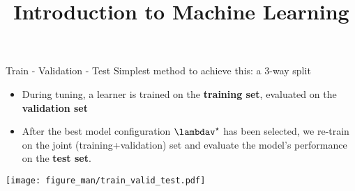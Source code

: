 \documentclass[11pt,compress,t,notes=noshow, xcolor=table]{beamer}
\title{Introduction to Machine Learning}
\institute{\href{https://compstat-lmu.github.io/lecture_i2ml/}{compstat-lmu.github.io/lecture\_i2ml}}
\date{}
\begin{document}











\begin{vbframe}{Train - Validation - Test}
Simplest method to achieve this: a 3-way split
\begin{itemize}
\item During tuning, a learner is trained on the \textbf{training set},
  evaluated on the  \textbf{validation set}
\item After the best model configuration $\lambdav^\star$ has been selected, we re-train on the joint (training+validation) set and evaluate the model's performance on the \textbf{test set}.
\end{itemize}
\begin{center}
\texttt{[image: figure\_man/train\_valid\_test.pdf]}
\end{center}
\end{vbframe}
\end{document}

